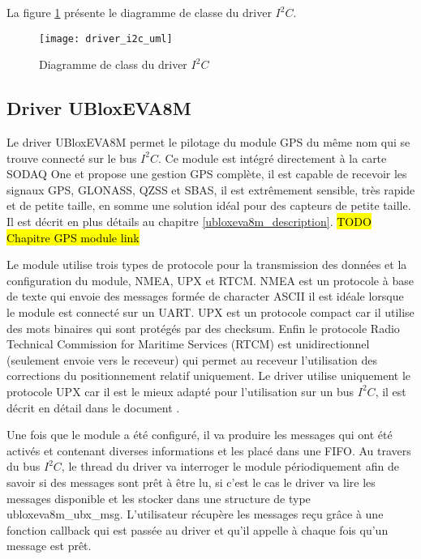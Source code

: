 La figure \ref{fig:driver_i2c_uml} présente le diagramme de classe du driver $I^{2}C$.

\begin{figure}[htb]
\centering 
\texttt{[image: driver\_i2c\_uml]} 
\caption{Diagramme de class du driver $I^{2}C$}
\label{fig:driver_i2c_uml}
\end{figure}

\subsection{Driver UBloxEVA8M}

Le driver UBloxEVA8M permet le pilotage du module GPS du même nom qui se trouve connecté sur le bus $I^{2}C$. Ce module est intégré directement à la carte SODAQ One et propose une gestion GPS complète, il est capable de recevoir les signaux GPS, GLONASS, QZSS et SBAS, il est extrêmement sensible, très rapide et de petite taille, en somme une solution idéal pour des capteurs de petite taille. Il est décrit en plus détails au chapitre \ref{ubloxeva8m_description}. 
\hl{TODO Chapitre GPS module link}

Le module utilise trois types de protocole pour la transmission des données et la configuration du module, NMEA, UPX et RTCM. NMEA est un protocole à base de texte qui envoie des messages formée de character ASCII il est idéale lorsque le module est connecté sur un UART. UPX est un protocole compact car il utilise des mots binaires qui sont protégés par des checksum. Enfin le protocole Radio Technical Commission for Maritime Services (RTCM) est unidirectionnel (seulement envoie vers le receveur) qui permet au receveur l'utilisation des corrections du positionnement relatif uniquement.
Le driver utilise uniquement le protocole UPX car il est le mieux adapté pour l'utilisation sur un bus $I^{2}C$, il est décrit en détail dans le document \cite{ublox-protocol}.

Une fois que le module a été configuré, il va produire les messages qui ont été activés et contenant diverses informations et les placé dans une FIFO. Au travers du bus $I^{2}C$, le thread du driver va interroger le module périodiquement afin de savoir si des messages sont prêt à être lu, si c'est le cas le driver va lire les messages disponible et les stocker dans une structure de type ubloxeva8m\_ubx\_msg. L'utilisateur récupère les messages reçu grâce à une fonction callback qui est passée au driver et qu'il appelle à chaque fois qu'un message est prêt.

